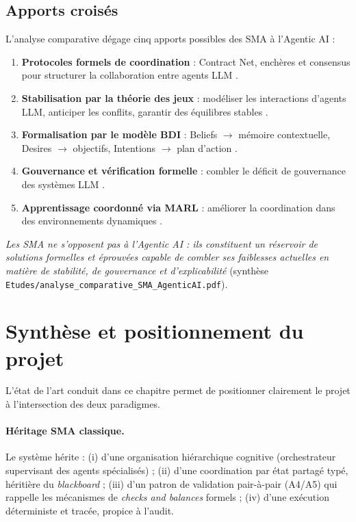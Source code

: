 \subsection{Apports croisés}

L'analyse comparative dégage cinq apports possibles des SMA à l'Agentic AI :

\begin{enumerate}
\item \textbf{Protocoles formels de coordination} : Contract Net, enchères et consensus pour structurer la collaboration entre agents LLM \cite{sma_general_survey,sma_cmu_marl,vaidhyanathan_taibi}.
\item \textbf{Stabilisation par la théorie des jeux} : modéliser les interactions d'agents LLM, anticiper les conflits, garantir des équilibres stables \cite{sma_general_survey,schneider2025}.
\item \textbf{Formalisation par le modèle BDI} : Beliefs $\rightarrow$ mémoire contextuelle, Desires $\rightarrow$ objectifs, Intentions $\rightarrow$ plan d'action \cite{sma_systemes,sapkota2026,schneider2025}.
\item \textbf{Gouvernance et vérification formelle} : combler le déficit de gouvernance des systèmes LLM \cite{milosevic_rabhi,hughes2025,patel2025}.
\item \textbf{Apprentissage coordonné via MARL} : améliorer la coordination dans des environnements dynamiques \cite{sma_cmu_marl,sapkota2026}.
\end{enumerate}

\noindent\textit{Les SMA ne s'opposent pas à l'Agentic AI : ils constituent un réservoir de solutions formelles et éprouvées capable de combler ses faiblesses actuelles en matière de stabilité, de gouvernance et d'explicabilité} (synthèse \texttt{Etudes/analyse\_comparative\_SMA\_AgenticAI.pdf}).

\section{Synthèse et positionnement du projet}
\label{sec:synthese_etat_art}

L'état de l'art conduit dans ce chapitre permet de positionner clairement le projet à l'intersection des deux paradigmes.

\paragraph{Héritage SMA classique.} Le système hérite : (i) d'une organisation hiérarchique cognitive (orchestrateur supervisant des agents spécialisés) ; (ii) d'une coordination par état partagé typé, héritière du \emph{blackboard} ; (iii) d'un patron de validation pair-à-pair (A4/A5) qui rappelle les mécanismes de \emph{checks and balances} formels ; (iv) d'une exécution déterministe et tracée, propice à l'audit.

